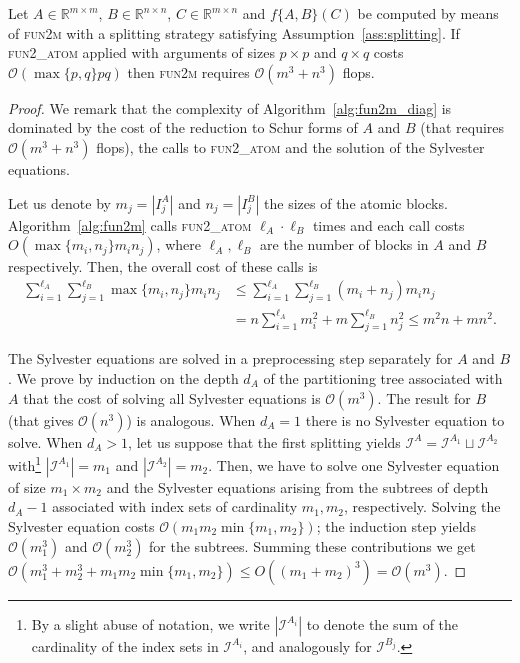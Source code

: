 \documentclass{siamart1116}
\begin{document}
\begin{lemma}\label{lem:complexity}
Let $A\in\mathbb R^{m\times m}$, $B\in\mathbb  R^{n\times n}$, $C\in\mathbb R^{m\times n}$ and $f\{A,B\}(C)$ be computed by means of \textsc{fun2m} with a splitting strategy satisfying Assumption~\ref{ass:splitting}.  If \textsc{fun2\_atom} applied with arguments of sizes $p\times p$ and $q\times q$ costs  $\mathcal O(\max\{p,q\}pq)$ then \textsc{fun2m} requires $\mathcal O(m^3+n^3)$ flops.
\end{lemma}
\begin{proof}
We remark that the complexity of Algorithm~\ref{alg:fun2m_diag} is dominated by the cost of the reduction to Schur forms of $A$ and $B$ (that requires $\mathcal O(m^3+n^3)$ flops), the calls to \textsc{fun2\_atom} and the solution of the Sylvester equations.

Let us denote by $m_j=|I_j^A|$ and $n_j=|I_j^B|$ the sizes of the atomic blocks. Algorithm~\ref{alg:fun2m} calls  \textsc{fun2\_atom} $\ell_A\cdot \ell_B$ times and each call costs $
O(\max\{m_i,n_j\}m_in_j)$, where $\ell_A,\ell_B$ are the number of blocks in $A$ and $B$ respectively. Then, the overall cost of these calls is
\begin{align*}
\sum_{i=1}^{\ell_A}\sum_{j=1}^{\ell_B}\max\{m_i,n_j\}m_in_j&\leq \sum_{i=1}^{\ell_A}\sum_{j=1}^{\ell_B}(m_i+n_j)m_in_j\\
&=n\sum_{i=1}^{\ell_A}m_i^2+m\sum_{j=1}^{\ell_B}n_j^2
\leq m^2n+mn^2.
\end{align*}

The Sylvester equations are solved in a preprocessing step separately for $A$ and $B$. We prove by induction on the depth $d_A$ of 
the partitioning tree associated with $A$ that the cost of solving all Sylvester equations is $\mathcal O(m^3)$. The result for $B$ (that gives $\mathcal O(n^3)$) is analogous. When $d_A=1$ there is no Sylvester equation to solve. When $d_A>1$, let us suppose that the first splitting yields $\mathcal I^A=\mathcal I^{A_1}\sqcup\mathcal I^{A_2}$ with\footnote{\label{foot:1}By a slight abuse of notation, 
we write $|\mathcal I^{A_i}|$ to denote the sum of the cardinality of the index sets in $\mathcal I^{A_i}$, and analogously for $\mathcal I^{B_j}$.} $|\mathcal I^{A_1}|=m_1$ and $|\mathcal I^{A_2}|=m_2$. Then, we have to solve one Sylvester equation of size $m_1\times m_2$ and the Sylvester equations arising from the subtrees of depth $d_A-1$ associated with index sets of cardinality $m_1,m_2$, respectively. Solving the  Sylvester equation costs $\mathcal O(m_1m_2\min\{m_1,m_2\})$; the induction step yields $\mathcal O(m_1
^3)$ and $\mathcal O(m_2^3)$ for the subtrees. Summing these contributions we get $\mathcal O(m_1^3+m_2^3+m_1m_2\min\{m_1,m_2\})\leq O((m_1+m_2)^3)=\mathcal O(m^3)$.
\end{proof}
\end{document}
